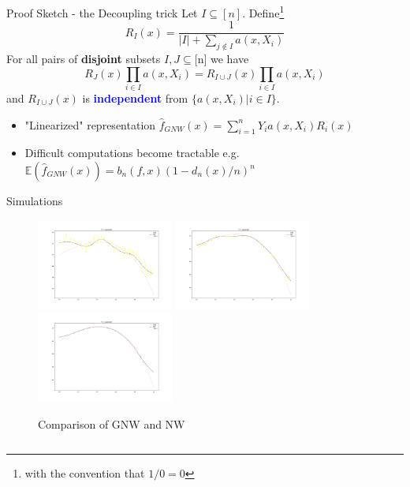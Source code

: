 \documentclass[final,dvipsnames]{beamer}
\newcommand{\myemphh}[1]{\textbf{\textcolor{blue}{#1}}}
\begin{document}
\begin{frame}
\begin{columns}[T]
\begin{column}{.6\textwidth}
\begin{block}{Proof Sketch - the Decoupling trick}
Let $I\subseteq [n]$. Define\footnote{with the convention that $1/0=0$}  
\begin{equation*}
    R_I(x)=
    \frac{1}{|I|+\sum_{j\notin I}a(x,X_i)}
\end{equation*}
For all pairs of \textbf{disjoint} subsets $I,J\subseteq$[n] we have
\begin{equation*}
R_J(x)\prod_{i\in I}a(x,X_i)=R_{I\cup J}(x)\prod_{i\in I}a(x,X_i)
\end{equation*}
and $R_{I\cup J}(x)$ is \myemphh{independent} from $\{a(x,X_i)|i\in I\}$.
\vspace{20pt}
\begin{itemize}
    \item "Linearized" representation 
 $\hat{f}_{GNW}(x)=\sum_{i=1}^nY_ia(x,X_i)R_i(x)$
\item Difficult computations become tractable e.g. $\mathbb{E}(\hat{f}_{GNW}(x))=b_n(f,x)(1-d_n(x)/n)^n$  
\end{itemize}
\end{block}
\begin{block}{Simulations}
\begin{figure}
    \centering
    \includegraphics[width=0.4\textwidth]{SSLAN_f_3_gaussian.png}
    \includegraphics[width=0.4\textwidth]{MSMN_f_3_gaussian.png}
    \includegraphics[width=0.4\textwidth]{LSLN_f_3_gaussian.png}
    \caption{Comparison of GNW and NW}
    \label{fig:simulations}
\end{figure}
\end{block}
\end{column}
\end{columns}
\end{frame}
\end{document}
